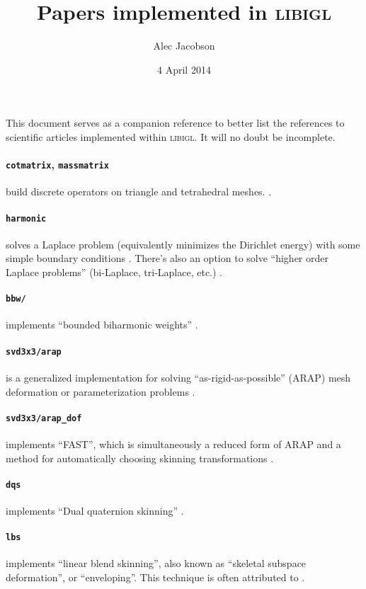 \documentclass[12pt]{diary}
\title{Papers implemented in \textsc{libigl}}
\author{Alec Jacobson}
\date{4 April 2014}
\begin{document}
This document serves as a companion reference to better list the references to
scientific articles implemented within \textsc{libigl}. It will no doubt be
incomplete.

\paragraph{\texttt{cotmatrix}, \texttt{massmatrix}}
build discrete operators on triangle and tetrahedral meshes. 
\cite{Pinkall:1993:CDM,meyer03ddo,Jacobson:THESIS:2013}. 

\paragraph{\texttt{harmonic}} solves a Laplace problem (equivalently
minimizes the Dirichlet energy) with some simple boundary conditions
\cite{HarmonicCoodinates07}. There's also an option to solve
``higher order Laplace problems'' (bi-Laplace, tri-Laplace, etc.)
\cite{Botsch:2004:AIF,sorkine04lsm,Jacobson:MixedFEM:2010}.

\paragraph{\texttt{bbw/}} implements ``bounded biharmonic
weights'' \cite{Jacobson:BBW:2011}.

\paragraph{\texttt{svd3x3/arap}} is a generalized implementation
for solving ``as-rigid-as-possible'' (ARAP) mesh deformation or parameterization
problems \cite{ARAP_modeling:2007,Liu:2008:ALA,Chao:2010:ASG}.

\paragraph{\texttt{svd3x3/arap\_dof}} implements ``FAST'',
which is simultaneously a reduced form of ARAP and a method for automatically
choosing skinning transformations \cite{Jacobson:FAST:2012}.

\paragraph{\texttt{dqs}} implements ``Dual quaternion skinning''
\cite{Kavan:2008:GSW}.

\paragraph{\texttt{lbs}} implements ``linear blend skinning'', also known as
``skeletal subspace deformation'', or ``enveloping''. This technique is often
attributed to \cite{Magnenat-Thalmann:1988:JLD}.


 
\end{document}
